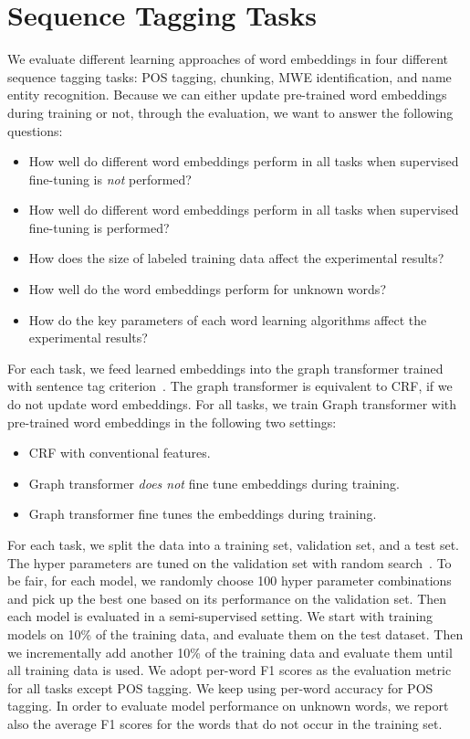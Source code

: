 \documentclass[11pt]{article}
\begin{document}
\section{Sequence Tagging Tasks}
We evaluate different learning approaches of word embeddings in four different sequence tagging tasks: POS tagging, chunking, MWE identification, and name entity recognition. Because we can either update pre-trained word embeddings during training or not, through the evaluation, we want to answer the following questions:
\begin{itemize}
\item How well do different word embeddings perform in all tasks when supervised fine-tuning is \textit{not} performed?
\item How well do different word embeddings perform in all tasks when supervised fine-tuning is performed?
\item How does the size of labeled training data affect the experimental results?
\item How well do the word embeddings perform for unknown words? 
\item How do the key parameters of each word learning algorithms affect the experimental results?
\end{itemize}

For each task, we feed learned embeddings into the graph transformer trained with sentence tag criterion~\cite{turian2010word}. The graph transformer is equivalent to CRF, if we do not update word embeddings. For all tasks, we train Graph transformer with pre-trained word embeddings in the following two settings: 
\begin{itemize}
\item CRF with conventional features.
\item Graph transformer \textit{does not} fine tune embeddings during training.
\item Graph transformer fine tunes the embeddings during training.
\end{itemize}
For each task, we split the data into a training set, validation set, and a test set. The hyper parameters are tuned on the validation set with random search~\cite{bergstra2012random}. To be fair, for each model, we randomly choose 100 hyper parameter combinations and pick up the best one based on its performance on the validation set. Then each model is evaluated in a semi-supervised setting. We start with training models on 10\% of the training data, and evaluate them on the test dataset. Then we incrementally add another 10\% of the training data and evaluate them until all training data is used. We adopt per-word F1 scores as the evaluation metric for all tasks except POS tagging. We keep using per-word accuracy for POS tagging. In order to evaluate model performance on unknown words, we report also the average F1 scores for the words that do not occur in the training set.
\end{document}

